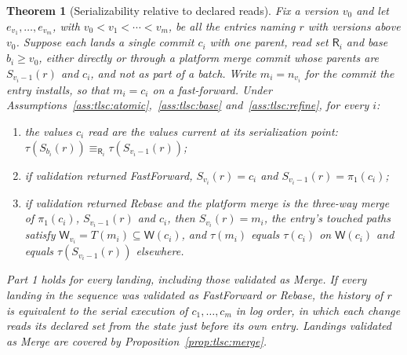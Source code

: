 \documentclass[11pt,letterpaper]{article}
\newtheorem{theorem}{Theorem}[section]
\theoremstyle{definition}
\theoremstyle{remark}
\newcommand{\R}{\mathsf{R}}
\newcommand{\W}{\mathsf{W}}
\newcommand{\Snap}[1]{S_{#1}}
\newcommand{\tree}{\tau}
\newcommand{\fp}{\pi_1}
\begin{document}
\begin{theorem}[Serializability relative to declared reads]
\label{thm:tlsc:serializability}
Fix a version $v_0$ and let $e_{v_1},\dots,e_{v_m}$, with $v_0<v_1<\cdots<v_m$, be all the entries naming $r$ with versions above $v_0$. Suppose each lands a single commit $c_i$ with one parent, read set $\R_i$ and base $b_i\geq v_0$, either directly or through a platform merge commit whose parents are $\Snap{v_i-1}(r)$ and $c_i$, and not as part of a batch. Write $m_i=n_{v_i}$ for the commit the entry installs, so that $m_i=c_i$ on a fast-forward. Under Assumptions~\ref{ass:tlsc:atomic},~\ref{ass:tlsc:base} and~\ref{ass:tlsc:refine}, for every $i$:
\begin{enumerate}
\item the values $c_i$ read are the values current at its serialization point: $\tree(\Snap{b_i}(r))\equiv_{\R_i}\tree(\Snap{v_i-1}(r))$;
\item if validation returned FastForward, $\Snap{v_i}(r)=c_i$ and $\Snap{v_i-1}(r)=\fp(c_i)$;
\item if validation returned Rebase and the platform merge is the three-way merge of $\fp(c_i)$, $\Snap{v_i-1}(r)$ and $c_i$, then $\Snap{v_i}(r)=m_i$, the entry's touched paths satisfy $\W_{v_i}=T(m_i)\subseteq\W(c_i)$, and $\tree(m_i)$ equals $\tree(c_i)$ on $\W(c_i)$ and equals $\tree(\Snap{v_i-1}(r))$ elsewhere.
\end{enumerate}
Part 1 holds for every landing, including those validated as Merge. If every landing in the sequence was validated as FastForward or Rebase, the history of $r$ is equivalent to the serial execution of $c_1,\dots,c_m$ in log order, in which each change reads its declared set from the state just before its own entry. Landings validated as Merge are covered by Proposition~\ref{prop:tlsc:merge}.
\end{theorem}
\end{document}
